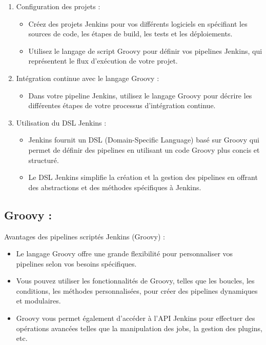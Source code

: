 \begin{enumerate}
\item Configuration des projets :

\begin{itemize}
\item Créez des projets Jenkins pour vos différents logiciels en spécifiant les sources de code, les étapes de build, les tests et les déploiements.

\item Utilisez le langage de script Groovy pour définir vos pipelines Jenkins, qui représentent le flux d’exécution de votre projet.
\end{itemize}

\item Intégration continue avec le langage Groovy :

\begin{itemize}
\item Dans votre pipeline Jenkins, utilisez le langage Groovy pour décrire les différentes étapes de votre processus d’intégration continue.
\end{itemize}

\item Utilisation du DSL Jenkins :

\begin{itemize}
\item Jenkins fournit un DSL (Domain-Specific Language) basé sur Groovy qui permet de définir des pipelines en utilisant un code Groovy plus concis et structuré.

\item Le DSL Jenkins simplifie la création et la gestion des pipelines en offrant des abstractions et des méthodes spécifiques à Jenkins.
\end{itemize}

\end{enumerate}
\subsection*{Groovy :}

Avantages des pipelines scriptés Jenkins (Groovy) :

\begin{itemize}
\item Le langage Groovy offre une grande flexibilité pour personnaliser vos pipelines selon vos besoins spécifiques.

\item Vous pouvez utiliser les fonctionnalités de Groovy, telles que les boucles, les conditions, les méthodes personnalisées, pour créer des pipelines dynamiques et modulaires.

\item Groovy vous permet également d’accéder à l’API Jenkins pour effectuer des opérations avancées telles que la manipulation des jobs, la gestion des plugins, etc.
\end{itemize}

